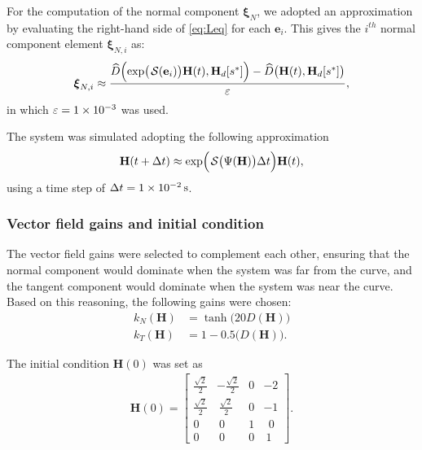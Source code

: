 For the computation of the normal component $\boldsymbol{\xi}_N$, we adopted an approximation by evaluating the right-hand side of \eqref{eq:Leq} for each $\mathbf{e}_i$. This gives the $i^{th}$ normal component element $\boldsymbol{\xi}_{N,i}$ as:
\begin{align}
    \boldsymbol{\xi}_{N,i} \approx \frac{\widehat{D}\Bigl(\exp\bigl(\SL[\boldsymbol{\mathbf{e}}_i]\bigr)\mathbf{H}(t), \mathbf{H}_d[s^*]\Bigr) - \widehat{D}\bigl(\mathbf{H}(t), \mathbf{H}_d[s^*]\bigr)}{\varepsilon},
\end{align} 
in which $\varepsilon = \num{1E-3}$ was used.

The system was simulated adopting the following approximation
\begin{align}
    \mathbf{H}(t + \Delta t) \approx \exp\Bigl(\SL\bigl(\Psi(\mathbf{H})\bigr)\Delta t\Bigr)\mathbf{H}(t),
\end{align}
using a time step of $\Delta t = \qty{1E-2}{\second}$. 
\subsubsection{Vector field gains and initial condition}
The vector field gains were selected to complement each other, ensuring that the normal component would dominate when the system was far from the curve, and the tangent component would dominate when the system was near the curve. Based on this reasoning, the following gains were chosen:
\begin{align}
    k_N(\mathbf{H}) &= \tanh\bigl(20D(\mathbf{H})\bigr)\\
    k_T(\mathbf{H}) &= 1 - 0.5\bigl(D(\mathbf{H})\bigr).
\end{align}

The initial condition $\mathbf{H}(0)$ was set as
\begin{align}
    \mathbf{H}(0) = \begin{bmatrix}
        \frac{\sqrt{2}}{2} & -\frac{\sqrt{2}}{2} & 0 & -2\\
        \frac{\sqrt{2}}{2} & \ \frac{\sqrt{2}}{2} & 0 & -1\\
        0 & \ 0 & 1 & \ \ 0\\
        0 & \ 0 & 0 & \ 1
    \end{bmatrix}.
\end{align}
